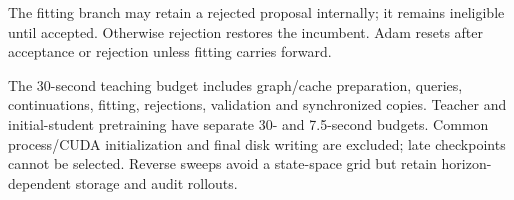 The fitting branch may retain a rejected proposal internally; it remains
ineligible until accepted. Otherwise rejection restores the incumbent.
Adam resets after acceptance or rejection unless fitting carries forward.

The 30-second teaching budget includes graph/cache preparation, queries,
continuations, fitting, rejections, validation and synchronized copies.
Teacher and initial-student pretraining have separate 30- and 7.5-second
budgets. Common process/CUDA initialization and final disk writing are
excluded; late checkpoints cannot be selected. Reverse sweeps avoid a
state-space grid but retain horizon-dependent storage and audit rollouts.
